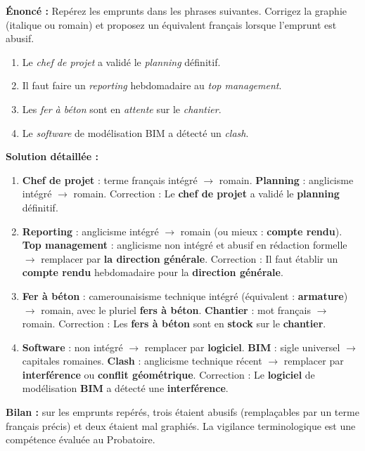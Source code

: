 \documentclass[11pt]{article}
\begin{document}
\begin{exoresolu}
\textbf{Énoncé :} Repérez les emprunts dans les phrases suivantes. Corrigez la graphie (italique ou romain) et proposez un équivalent français lorsque l'emprunt est abusif.
\begin{enumerate}
    \item \og{}Le \textit{chef de projet} a validé le \textit{planning} définitif.\fg{}
    \item \og{}Il faut faire un \textit{reporting} hebdomadaire au \textit{top management}.\fg{}
    \item \og{}Les \textit{fer à béton} sont en \textit{attente} sur le \textit{chantier}.\fg{}
    \item \og{}Le \textit{software} de modélisation BIM a détecté un \textit{clash}.\fg{}
\end{enumerate}
\tcblower
\textbf{Solution détaillée :}
\begin{enumerate}
    \item \textbf{Chef de projet} : terme français intégré $\rightarrow$ romain. \textbf{Planning} : anglicisme intégré $\rightarrow$ romain. Correction : \og{}Le \textbf{chef de projet} a validé le \textbf{planning} définitif.\fg{}
    \item \textbf{Reporting} : anglicisme intégré $\rightarrow$ romain (ou mieux : \textbf{compte rendu}). \textbf{Top management} : anglicisme non intégré et abusif en rédaction formelle $\rightarrow$ remplacer par \textbf{la direction générale}. Correction : \og{}Il faut établir un \textbf{compte rendu} hebdomadaire pour la \textbf{direction générale}.\fg{}
    \item \textbf{Fer à béton} : camerounaisisme technique intégré (équivalent : \textbf{armature}) $\rightarrow$ romain, avec le pluriel \textbf{fers à béton}. \textbf{Chantier} : mot français $\rightarrow$ romain. Correction : \og{}Les \textbf{fers à béton} sont en \textbf{stock} sur le \textbf{chantier}.\fg{}
    \item \textbf{Software} : non intégré $\rightarrow$ remplacer par \textbf{logiciel}. \textbf{BIM} : sigle universel $\rightarrow$ capitales romaines. \textbf{Clash} : anglicisme technique récent $\rightarrow$ remplacer par \textbf{interférence} ou \textbf{conflit géométrique}. Correction : \og{}Le \textbf{logiciel} de modélisation \textbf{BIM} a détecté une \textbf{interférence}.\fg{}
\end{enumerate}
\textbf{Bilan :} sur les emprunts repérés, trois étaient abusifs (remplaçables par un terme français précis) et deux étaient mal graphiés. La vigilance terminologique est une compétence évaluée au Probatoire.
\end{exoresolu}
\end{document}
